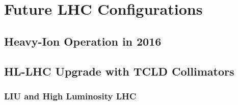 \chapter{Future LHC Configurations}






\section{Heavy-Ion Operation in 2016}







\section{HL-LHC Upgrade with TCLD Collimators} \label{chap:hllhc}
%


\subsection{LIU and High Luminosity LHC}

